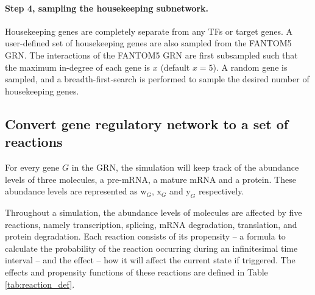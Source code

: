 \paragraph{Step 4, sampling the housekeeping subnetwork.}
Housekeeping genes are completely separate from any TFs or target genes. A user-defined set of housekeeping genes are also sampled from the FANTOM5 GRN. The interactions of the FANTOM5 GRN are first subsampled such that the maximum in-degree of each gene is $x$ (default $x=5$). A random gene is sampled, and a breadth-first-search is performed to sample the desired number of housekeeping genes.

\subsection{Convert gene regulatory network to a set of reactions} \label{sec:reactions}
\newcommand{\w}[1]{\text{w}_{#1}}
\newcommand{\x}[1]{\text{x}_{#1}}
\newcommand{\y}[1]{\text{y}_{#1}}


\newcommand{\rs}[1]{\text{R}_{#1}}
\newcommand{\rp}[1]{\text{R}^+_{#1}}
\newcommand{\rn}[1]{\text{R}^-_{#1}}

\newcommand{\wpr}[1]{\text{wpr}_{#1}}
\newcommand{\wsr}[1]{\text{wsr}_{#1}}
\newcommand{\xdr}[1]{\text{xdr}_{#1}}
\newcommand{\ypr}[1]{\text{ypr}_{#1}}
\newcommand{\ydr}[1]{\text{ydr}_{#1}}

\newcommand{\str}[1]{\text{str}_{#1}}
\newcommand{\co}[1]{\text{co}_{#1}}
\newcommand{\ind}[1]{\text{ind}_{#1}}
\newcommand{\hmy}[1]{\text{hmy}_{#1}}
\newcommand{\reg}[1]{\text{reg}_{#1}}
\newcommand{\ba}[1]{\text{ba}_{#1}}

For every gene $G$ in the GRN, the simulation will keep track of the abundance levels of three molecules, a pre-mRNA, a mature mRNA and a protein. These abundance levels are represented as $\w G$, $\x G$ and $\y G$ respectively. 

Throughout a simulation, the abundance levels of molecules are affected by five reactions, namely transcription, splicing, mRNA degradation, translation, and protein degradation. Each reaction consists of its propensity -- a formula to calculate the probability of the reaction occurring during an infinitesimal time interval -- and the effect -- how it will affect the current state if triggered. The effects and propensity functions of these reactions are defined in Table \ref{tab:reaction_def}.


